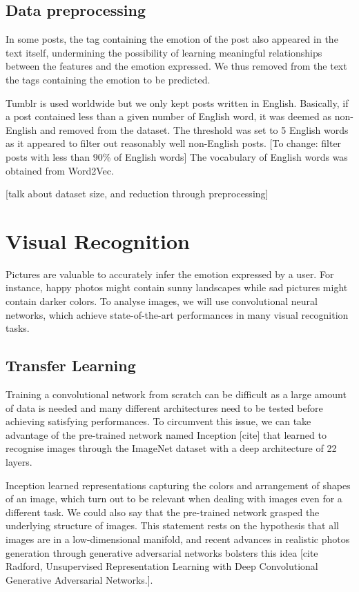 \documentclass{article} %
\begin{document}
\subsection{Data preprocessing}
In some posts, the tag containing the emotion of the post also appeared in the text itself, undermining the possibility of learning meaningful relationships between the features and the emotion expressed. We thus removed from the text the tags containing the emotion to be predicted.

Tumblr is used worldwide but we only kept posts written in English. Basically, if a post contained less than a given number of English word, it was deemed as non-English and removed from the dataset. The threshold was set to 5 English words as it appeared to filter out reasonably well non-English posts. [To change: filter posts with less than 90\% of English words] The vocabulary of English words was obtained from Word2Vec.

[talk about dataset size, and reduction through preprocessing]

\section{Visual Recognition}
Pictures are valuable to accurately infer the emotion expressed by a user. For instance, happy photos might contain sunny landscapes while sad pictures might contain darker colors. To analyse images, we will use convolutional neural networks, which achieve state-of-the-art performances in many visual recognition tasks.

\subsection{Transfer Learning}
Training a convolutional network from scratch can be difficult as a large amount of data is needed and many different architectures need to be tested before achieving satisfying performances. To circumvent this issue, we can take advantage of the pre-trained network named Inception [cite] that learned to recognise images through the ImageNet dataset with a deep architecture of 22 layers.

Inception learned representations capturing the colors and arrangement of shapes of an image, which turn out to be relevant when dealing with images even for a different task. We could also say that the pre-trained network grasped the underlying structure of images. This statement rests on the hypothesis that all images are in a low-dimensional manifold, and recent advances in realistic photos generation through generative adversarial networks bolsters this idea [cite Radford, Unsupervised Representation Learning with Deep Convolutional Generative Adversarial Networks.]. 
\end{document}
